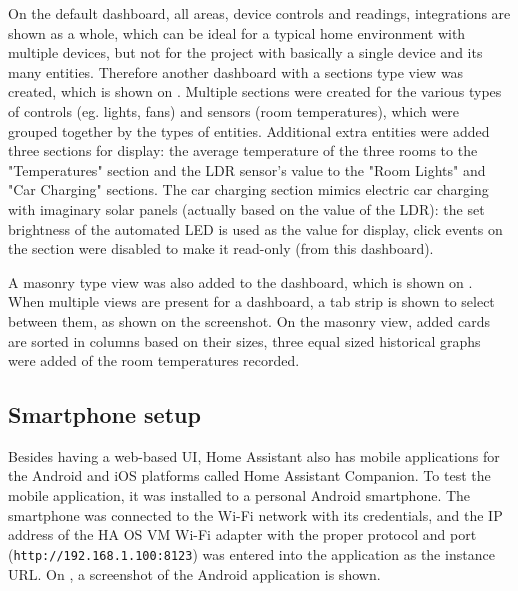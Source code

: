 On the default dashboard, all areas, device controls and readings, integrations are shown as a whole, which can be ideal for a typical home environment with multiple devices, but not for the project with basically a single device and its many entities. Therefore another dashboard with a sections type view was created, which is shown on . Multiple sections were created for the various types of controls (eg. lights, fans) and sensors (room temperatures), which were grouped together by the types of entities. Additional extra entities were added three sections for display: the average temperature of the three rooms to the "Temperatures" section and the LDR sensor's value to the "Room Lights" and "Car Charging" sections. The car charging section mimics electric car charging with imaginary solar panels (actually based on the value of the LDR): the set brightness of the automated LED is used as the value for display, click events on the section were disabled to make it read-only (from this dashboard).

A masonry type view was also added to the dashboard, which is shown on . When multiple views are present for a dashboard, a tab strip is shown to select between them, as shown on the screenshot. On the masonry view, added cards are sorted in columns based on their sizes, three equal sized historical graphs were added of the room temperatures recorded.

\subsection{Smartphone setup}

Besides having a web-based UI, Home Assistant also has mobile applications for the Android and iOS platforms called Home Assistant Companion. \cite{HACompanion} To test the mobile application, it was installed to a personal Android smartphone. The smartphone was connected to the Wi-Fi network with its credentials, and the IP address of the HA OS VM Wi-Fi adapter with the proper protocol and port (\verb+http://192.168.1.100:8123+) was entered into the application as the instance URL. On , a screenshot of the Android application is shown.

